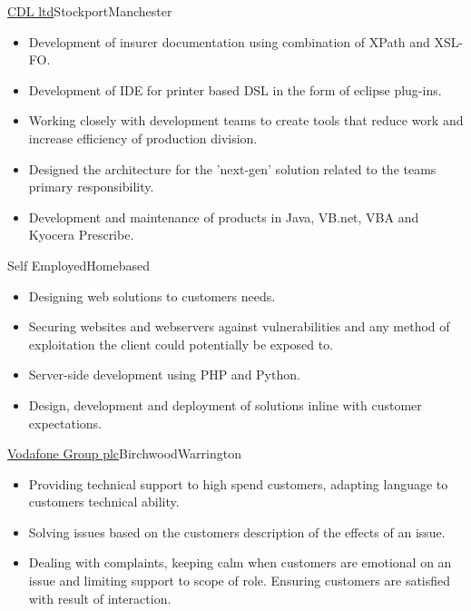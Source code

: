 \documentclass[a4paper,10pt]{moderncv}
\newcommand\weblink[2] {{\color{href} \href{#1}{#2}}}
\begin{document}
{\weblink{http://www.cdl.co.uk}{CDL ltd}}{Stockport}{Manchester}{
\begin{itemize}
  \item Development of insurer documentation using combination of XPath and XSL-FO.
  \item Development of IDE for printer based DSL in the form of eclipse plug-ins.
  \item Working closely with development teams to create tools that reduce work and increase efficiency of production division.
  \item Designed the architecture for the 'next-gen' solution related to the teams primary responsibility.
  \item Development and maintenance of products in Java, VB.net, VBA and Kyocera Prescribe.
\end{itemize}
}

{Self Employed}{Homebased}{}{
\begin{itemize}
  \item Designing web solutions to customers needs.
  \item Securing websites and webservers against vulnerabilities and any method of exploitation the client could potentially be exposed to.
  \item Server-side development using PHP and Python.
  \item Design, development and deployment of solutions inline with customer expectations.
\end{itemize}
}

{\weblink{http://www.vodafone.com/}{Vodafone Group plc}}{Birchwood}{Warrington}{
\begin{itemize}
  \item Providing technical support to high spend customers, adapting language to customers technical ability.
  \item Solving issues based on the customers description of the effects of an issue.
  \item Dealing with complaints, keeping calm when customers are emotional on an issue and limiting support to scope of role. Ensuring customers are satisfied with result of interaction.
\end{itemize}
}
\end{document}
